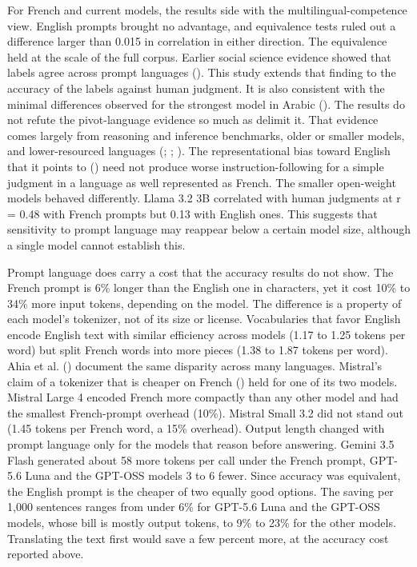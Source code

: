 \documentclass[
  man,
  floatsintext,
  longtable,
  nolmodern,
  notxfonts,
  notimes,
  colorlinks=true,linkcolor=blue,citecolor=blue,urlcolor=blue]{apa7}
\begin{document}
For French and current models, the results side with the
multilingual-competence view. English prompts brought no advantage, and
equivalence tests ruled out a difference larger than 0.015 in
correlation in either direction. The equivalence held at the scale of
the full corpus. Earlier social science evidence showed that labels
agree across prompt languages
(). This
study extends that finding to the accuracy of the labels against human
judgment. It is also consistent with the minimal differences observed
for the strongest model in Arabic
(). The results
do not refute the pivot-language evidence so much as delimit it. That
evidence comes largely from reasoning and inference benchmarks, older or
smaller models, and lower-resourced languages
(;
;
).
The representational bias toward English that it points to
() need not produce
worse instruction-following for a simple judgment in a language as well
represented as French. The smaller open-weight models behaved
differently. Llama 3.2 3B correlated with human judgments at r = 0.48
with French prompts but 0.13 with English ones. This suggests that
sensitivity to prompt language may reappear below a certain model size,
although a single model cannot establish this.

Prompt language does carry a cost that the accuracy results do not show.
The French prompt is 6\% longer than the English one in characters, yet
it cost 10\% to 34\% more input tokens, depending on the model. The
difference is a property of each model's tokenizer, not of its size or
license. Vocabularies that favor English encode English text with
similar efficiency across models (1.17 to 1.25 tokens per word) but
split French words into more pieces (1.38 to 1.87 tokens per word). Ahia
et al. () document the same
disparity across many languages. Mistral's claim of a tokenizer that is
cheaper on French () held for one of its two models. Mistral Large 4 encoded French
more compactly than any other model and had the smallest French-prompt
overhead (10\%). Mistral Small 3.2 did not stand out (1.45 tokens per
French word, a 15\% overhead). Output length changed with prompt
language only for the models that reason before answering. Gemini 3.5
Flash generated about 58 more tokens per call under the French prompt,
GPT-5.6 Luna and the GPT-OSS models 3 to 6 fewer. Since accuracy was
equivalent, the English prompt is the cheaper of two equally good
options. The saving per 1,000 sentences ranges from under 6\% for
GPT-5.6 Luna and the GPT-OSS models, whose bill is mostly output tokens,
to 9\% to 23\% for the other models. Translating the text first would
save a few percent more, at the accuracy cost reported above.
\end{document}
